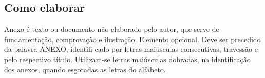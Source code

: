 %
%

\begin{anexosenv}

\chapter{Como elaborar}

Anexo é texto ou documento não elaborado pelo autor, que serve de fundamentação, comprovação e ilustração. Elemento opcional. Deve ser precedido da palavra ANEXO, identifi-cado por letras maiúsculas consecutivas, travessão e pelo respectivo título. Utilizam-se letras maiúsculas dobradas, na identificação dos anexos, quando esgotadas as letras do alfabeto.


\end{anexosenv}